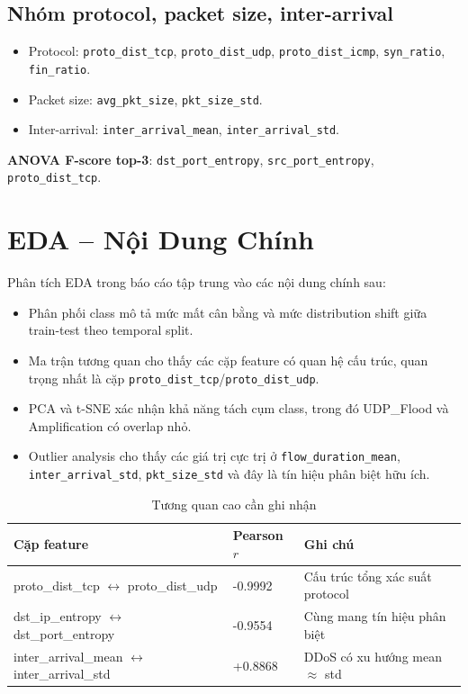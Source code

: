 \documentclass[12pt,a4paper]{article}
\begin{document}
\subsection{Nhóm protocol, packet size, inter-arrival}
\begin{itemize}[leftmargin=2em]
\item Protocol: \texttt{proto\_dist\_tcp}, \texttt{proto\_dist\_udp}, \texttt{proto\_dist\_icmp}, \texttt{syn\_ratio}, \texttt{fin\_ratio}.
\item Packet size: \texttt{avg\_pkt\_size}, \texttt{pkt\_size\_std}.
\item Inter-arrival: \texttt{inter\_arrival\_mean}, \texttt{inter\_arrival\_std}.
\end{itemize}

\textbf{ANOVA F-score top-3}: \texttt{dst\_port\_entropy}, \texttt{src\_port\_entropy}, \texttt{proto\_dist\_tcp}.

\section{EDA -- Nội Dung Chính}

Phân tích EDA trong báo cáo tập trung vào các nội dung chính sau:
\begin{itemize}[leftmargin=2em]
\item Phân phối class mô tả mức mất cân bằng và mức distribution shift giữa train-test theo temporal split.
\item Ma trận tương quan cho thấy các cặp feature có quan hệ cấu trúc, quan trọng nhất là cặp \texttt{proto\_dist\_tcp}/\texttt{proto\_dist\_udp}.
\item PCA và t-SNE xác nhận khả năng tách cụm class, trong đó UDP\_Flood và Amplification có overlap nhỏ.
\item Outlier analysis cho thấy các giá trị cực trị ở \texttt{flow\_duration\_mean}, \texttt{inter\_arrival\_std}, \texttt{pkt\_size\_std} và đây là tín hiệu phân biệt hữu ích.
\end{itemize}

\begin{table}[H]
\centering
\caption{Tương quan cao cần ghi nhận}
\begin{tabular}{lll}
\toprule
\textbf{Cặp feature} & \textbf{Pearson $r$} & \textbf{Ghi chú} \\
\midrule
proto\_dist\_tcp $\leftrightarrow$ proto\_dist\_udp & -0.9992 & Cấu trúc tổng xác suất protocol \\
dst\_ip\_entropy $\leftrightarrow$ dst\_port\_entropy & -0.9554 & Cùng mang tín hiệu phân biệt \\
inter\_arrival\_mean $\leftrightarrow$ inter\_arrival\_std & +0.8868 & DDoS có xu hướng mean $\approx$ std \\
\bottomrule
\end{tabular}
\end{table}
\end{document}
